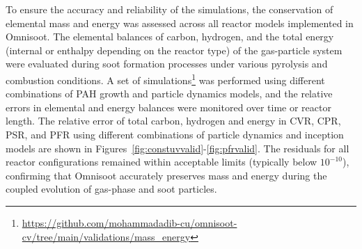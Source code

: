 \noindent To ensure the accuracy and reliability of the simulations, the conservation of elemental mass and energy was assessed across all reactor models implemented in Omnisoot. The elemental balances of carbon, hydrogen, and the total energy (internal or enthalpy depending on the reactor type) of the gas-particle system were evaluated during soot formation processes under various pyrolysis and combustion conditions.
A set of simulations\footnote{\href{https://github.com/mohammadadib-cu/omnisoot-cv/tree/main/validations/mass_energy}{https://github.com/mohammadadib-cu/omnisoot-cv/tree/main/validations/mass\_energy}} was performed using different combinations of PAH growth and particle dynamics models, and the relative errors in elemental and energy balances were monitored over time or reactor length. The relative error of total carbon, hydrogen and energy in CVR, CPR, PSR, and PFR using different combinations of particle dynamics and inception models are shown in Figures~\ref{fig:constuvvalid}-\ref{fig:pfrvalid}. The residuals for all reactor configurations remained within acceptable limits (typically below $10^{-10}$), confirming that Omnisoot accurately preserves mass and energy during the coupled evolution of gas-phase and soot particles. 
 


